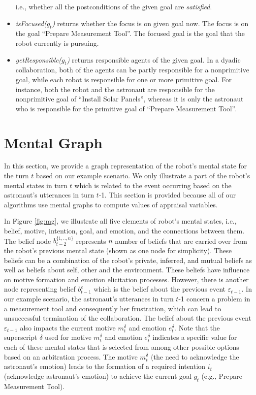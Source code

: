 \documentclass{aamas2016}
\begin{document}
\begin{itemize}
  i.e., whether all the postconditions of the given goal are \textit{satisfied}.
  \item \textit{isFocused($g_t$)} returns whether the focus is on given
  goal now. The focus is on the goal ``Prepare Measurement Tool''. The focused
  goal is the goal that the robot currently is pursuing.
  \item \textit{getResponsible($g_t$)} returns responsible agents of the
  given goal. In a dyadic collaboration, both of the agents can be partly
  responsible for a nonprimitive goal, while each robot is responsible for one
  or more primitive goal. For instance, both the robot and the astronaut are
  responsible for the nonprimitive goal of ``Install Solar Panels'', whereas
  it is only the astronaut who is responsible for the primitive goal of
  ``Prepare Measurement Tool''.
\end{itemize}

\section{Mental Graph}
\label{sec:mental-graph}

In this section, we provide a graph representation of the robot's mental state
for the turn $t$ based on our example scenario. We only illustrate a part of the
robot's mental states in turn $t$ which is related to the event occurring based
on the astronaut's utterances in turn $t$-1. This section is provided because
all of our algorithms use mental graphs to compute values of appraisal
variables.

In Figure \ref{fig:mg}, we illustrate all five elements of robot's mental
states, i.e., belief, motive, intention, goal, and emotion, and the connections
between them. The belief node $b^{\{1,..,n\}}_{t-2}$ represents $n$ number of
beliefs that are carried over from the robot's previous mental state (shown as
one node for simplicity). These beliefs can be a combination of the robot's
private, inferred, and mutual beliefs as well as beliefs about self, other and
the environment. These beliefs have influence on motive formation and emotion
elicitation processes. However, there is another node representing belief
$b^{\varepsilon}_{t-1}$ which is the belief about the previous event
$\varepsilon_{t-1}$. In our example scenario, the astronaut's utterances in turn
$t$-1 concern a problem in a measurement tool and consequently her frustration,
which can lead to unsuccessful termination of the collaboration. The belief
about the previous event $\varepsilon_{t-1}$ also impacts the current motive
$m^{\delta}_t$ and emotion $e^{\delta}_t$. Note that the superscript $\delta$
used for motive $m^{\delta}_t$ and emotion $e^{\delta}_t$ indicates a specific
value for each of these mental states that is selected from among other possible
options based on an arbitration process. The motive $m^{\delta}_t$ (the need to
acknowledge the astronaut's emotion) leads to the formation of a required
intention $i_t$ (acknowledge astronaut's emotion) to achieve the current goal
$g_t$ (e.g., Prepare Measurement Tool).
\end{document}
